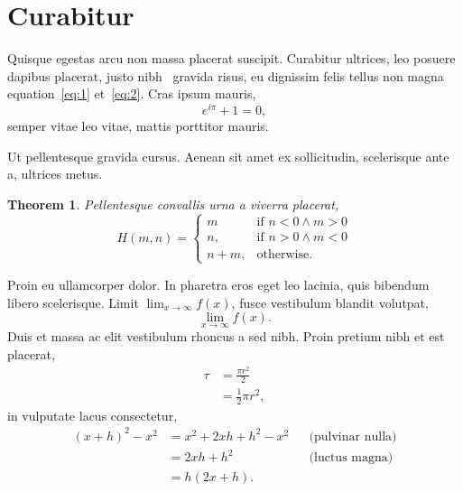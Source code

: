 \documentclass[a4paper,12pt]{article}
\newtheorem{theorem}{Theorem}
\begin{document}
\section{Curabitur}
\label{sec:curabitur}


Quisque egestas arcu non massa placerat suscipit. Curabitur ultrices,
leo posuere dapibus placerat, justo nibh~\pageref{sec:lorem} gravida
risus, eu dignissim felis tellus non magna equation~\ref{eq:1} et~\ref{eq:2}.
Cras ipsum mauris,
%
\begin{displaymath}
  e^{i\pi} + 1 = 0,
\end{displaymath}
%
semper vitae leo vitae, mattis porttitor mauris. 


Ut pellentesque gravida cursus. Aenean sit amet ex sollicitudin,
scelerisque ante a, ultrices metus.
%
\begin{theorem}
%
  Pellentesque convallis urna a viverra placerat,
%
  \begin{equation}
    \label{eq:4}
%
    H(m, n) = 
    \begin{cases}
      m    & \text{if } n < 0 \land m > 0 \\
      n,   & \text{if } n > 0 \land m < 0 \\
      n+m, & \text{otherwise}.
    \end{cases}
%
  \end{equation}
%
\end{theorem}


Proin eu ullamcorper dolor. In pharetra eros eget leo lacinia, quis
bibendum libero scelerisque. Limit $\lim_{x\to\infty} f(x)$, fusce
vestibulum blandit volutpat,
%
\begin{displaymath}
  \lim_{x \to \infty} f(x). 
\end{displaymath}
%
Duis et massa ac elit vestibulum rhoncus a sed nibh. Proin pretium
nibh et est placerat, 
%
\begin{equation}
  \label{eq:split}
  \begin{split}
    \tau &= \frac{\pi r^2}{2}   \\
         &= \frac{1}{2} \pi r^2,
  \end{split}
\end{equation}
%
in vulputate lacus consectetur,
%
\begin{align*}
  (x + h)^2 - x^2 &= x^2  + 2xh + h^2 - x^2 && \text{(pulvinar nulla)} \\
                  &= 2xh  + h^2             && \text{(luctus magna)} \\
                  &= h(2x + h).
\end{align*}
\end{document}
